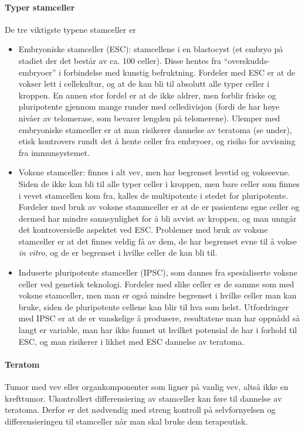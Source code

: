 \paragraph{Typer stamceller} De tre viktigste typene stamceller er 
\begin{itemize}[nolistsep,noitemsep]
	\item Embryoniske stamceller (ESC): stamcellene i en blastocyst (et embryo på stadiet der det består av ca. 100 celler). Disse hentes fra ``overskudds-embryoer'' i forbindelse med kunstig befruktning. Fordeler med ESC er at de vokser lett i cellekultur, og at de kan bli til absolutt alle typer celler i kroppen. En annen stor fordel er at de ikke aldrer, men forblir friske og pluripotente gjennom mange runder med celledivisjon (fordi de har høye nivåer av telomerase, som bevarer lengden på telomerene). Ulemper med embryoniske stamceller er at man risikerer dannelse av teratoma (se under), etisk kontrovers rundt det å hente celler fra embryoer, og risiko for avvisning fra immunsystemet.
	\item Voksne stamceller: finnes i alt vev, men har begrenset levetid og vokseevne. Siden de ikke kan bli til alle typer celler i kroppen, men bare celler som finnes i vevet stamcellen kom fra, kalles de multipotente i stedet for pluripotente. Fordeler med bruk av voksne stammceller er at de er pasientens egne celler og dermed har mindre sannsynlighet for å bli avvist av kroppen, og man unngår det kontroversielle aspektet ved ESC. Problemer med bruk av voksne stamceller er at det finnes veldig få av dem, de har begrenset evne til å vokse \emph{in vitro}, og de er begrenset i hvilke celler de kan bli til.
	\item Induserte pluripotente stamceller (IPSC), som dannes fra spesialiserte voksne celler ved genetisk teknologi. Fordeler med slike celler er de samme som med voksne stamceller, men man er også mindre begrenset i hvilke celler man kan bruke, siden de pluripotente cellene kan blir til hva som helst. Utfordringer med IPSC er at de er vanskelige å produsere, resultatene man har oppnådd så langt er variable, man har ikke funnet ut hvilket potensial de har i forhold til ESC, og man risikerer i likhet med ESC dannelse av teratoma.
\end{itemize}

\paragraph{Teratom} Tumor med vev eller organkomponenter som ligner på vanlig vev, altså ikke en krefttumor. Ukontrollert differensiering av stamceller kan føre til dannelse av teratoma. Derfor er det nødvendig med streng kontroll på selvfornyelsen og differensieringen til stamceller når man skal bruke dem terapeutisk.

